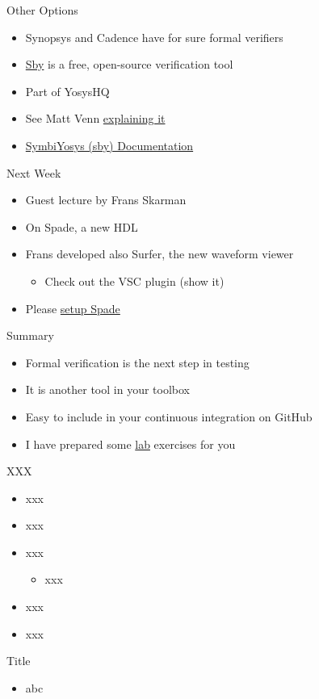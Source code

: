 \begin{frame}[fragile]{Other Options}
\begin{itemize}
\item Synopsys and Cadence have for sure formal verifiers
\item \href{https://github.com/YosysHQ/sby}{Sby} is a free, open-source verification tool
\item Part of YosysHQ
\item See Matt Venn \href{https://www.youtube.com/watch?v=B1KX2rFJqVE}{explaining it}
\item \href{https://symbiyosys.readthedocs.io/en/latest/index.html}{SymbiYosys (sby) Documentation}
\end{itemize}
\end{frame}

\begin{frame}[fragile]{Next Week}
\begin{itemize}
\item Guest lecture by Frans Skarman
\item On Spade, a new HDL
\item Frans developed also Surfer, the new waveform viewer
\begin{itemize}
\item Check out the VSC plugin (show it)
\end{itemize}
\item Please \href{https://docs.spade-lang.org/agile/quick_setup.html}{setup Spade}
\end{itemize}
\end{frame}

\begin{frame}[fragile]{Summary}
\begin{itemize}
\item Formal verification is the next step in testing
\item It is another tool in your toolbox
\item Easy to include in your continuous integration on GitHub
\item I have prepared some \href{https://github.com/schoeberl/agile-hw/tree/main/lab8}{lab} exercises for you
\end{itemize}
\end{frame}




\begin{frame}[fragile]{XXX}
\begin{itemize}
\item xxx
\item xxx
\item xxx
\begin{itemize}
\item xxx
\end{itemize}
\item xxx
\item xxx
\end{itemize}
\end{frame}

\begin{frame}[fragile]{Title}
\begin{itemize}
\item abc
\end{itemize}
\end{frame}
